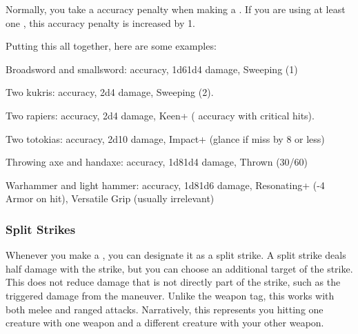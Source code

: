 
    Normally, you take a  accuracy penalty when making a .
    If you are using at least one , this accuracy penalty is increased by 1.

    Putting this all together, here are some examples:
    \begin{raggeditemize}
      \item Broadsword and smallsword:  accuracy, 1d6\plus1d4 damage, Sweeping (1)
      \item Two kukris:  accuracy, 2d4 damage, Sweeping (2).
      \item Two rapiers:  accuracy, 2d4 damage, Keen+ ( accuracy with critical hits).
      \item Two totokias:  accuracy, 2d10 damage, Impact+ (glance if miss by 8 or less)
      \item Throwing axe and handaxe:  accuracy, 1d8\plus1d4 damage, Thrown (30/60)
      \item Warhammer and light hammer:  accuracy, 1d8\plus1d6 damage, Resonating+ (-4 Armor on hit), Versatile Grip (usually irrelevant)
    \end{raggeditemize}

    \subsubsection{Split Strikes}
      Whenever you make a , you can designate it as a split strike.
      A split strike deals half damage with the strike, but you can choose an additional target of the strike.
      This does not reduce damage that is not directly part of the strike, such as the triggered damage from the  maneuver.
      Unlike the  weapon tag, this works with both melee and ranged attacks.
      Narratively, this represents you hitting one creature with one weapon and a different creature with your other weapon.

